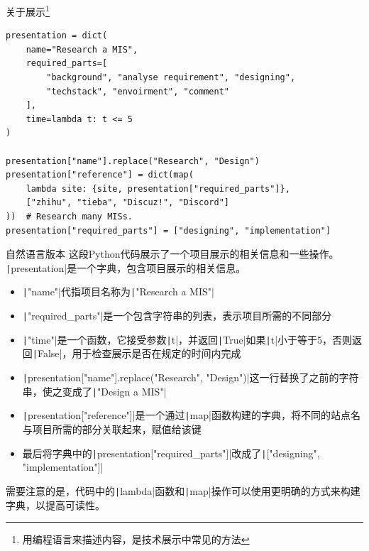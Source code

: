 \documentclass[UTF8]{ctexbeamer}
\begin{document}
\begin{frame}[fragile]{关于展示\footnote[1]{用编程语言来描述内容，是技术展示中常见的方法}}\label{About}
\begin{verbatim}
presentation = dict(
    name="Research a MIS",
    required_parts=[
        "background", "analyse requirement", "designing",
        "techstack", "envoirment", "comment"
    ],
    time=lambda t: t <= 5
)

presentation["name"].replace("Research", "Design")
presentation["reference"] = dict(map(
    lambda site: {site, presentation["required_parts"]},
    ["zhihu", "tieba", "Discuz!", "Discord"]
))  # Research many MISs.
presentation["required_parts"] = ["designing", "implementation"]
\end{verbatim}
\end{frame}
\begin{frame}
\begin{block}{自然语言版本\footnotemark[1]}
\footnotesize
这段Python代码展示了一个项目展示的相关信息和一些操作。
\texttt|presentation|是一个字典，包含项目展示的相关信息。
\begin{itemize}
  \item \texttt|"name"|代指项目名称为\texttt|"Research a MIS"|
  \item \texttt|"required_parts"|是一个包含字符串的列表，表示项目所需的不同部分
  \item \texttt|"time"|是一个函数，它接受参数\texttt|t|，并返回\texttt|True|如果\texttt|t|小于等于5，否则返回\texttt|False|，用于检查展示是否在规定的时间内完成
  \item \texttt|presentation["name"].replace("Research", "Design")|这一行替换了之前的字符串，使之变成了\texttt|"Design a MIS"|
  \item \texttt|presentation["reference"]|是一个通过\texttt|map|函数构建的字典，将不同的站点名与项目所需的部分关联起来，赋值给该键
  \item 最后将字典中的\texttt|presentation["required_parts"]|改成了\texttt|["designing", "implementation"]|
\end{itemize}
需要注意的是，代码中的\texttt|lambda|函数和\texttt|map|操作可以使用更明确的方式来构建字典，以提高可读性。
\end{block}
\normalsize
\end{frame}
\end{document}
